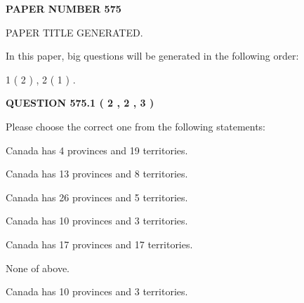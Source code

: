 \documentclass[12pt]{article}
\begin{document}
   
   
   
\newpage 
\setcounter{page}{ 
   575001 } 
   
   
   
   
 {\textbf{ \Large{ PAPER NUMBER  575  }}}
   
   
\vspace{0.2in}
   
   
   
   
   
   
   
   
 \vspace{0.2in}
 
 
 
 
   
   
 PAPER TITLE GENERATED.
   
   
   
\vspace{0.2in}
   
In this paper, big questions will be generated in the following order: 
   
   
   1 ( 2 )
 ,
   2 ( 1 )
 .
  
\vspace{0.2in}
  
{\textbf{\Large{QUESTION
575.1 
 ( 2 , 2 , 3 )
}}}
  
  
Please choose the correct one from the following statements:
 
 
Canada has   4 provinces and  19 territories.
 
 
Canada has  13 provinces and  8 territories.
 
 
Canada has  26 provinces and  5 territories.
 
 
Canada has 10  provinces and 3 territories.
 
 
Canada has  17 provinces and  17 territories.
 
 
 None of above.
 
 
\noindent{}
 
 
Canada has 10  provinces and 3 territories.
 
 
\noindent{}
 
\end{document}
